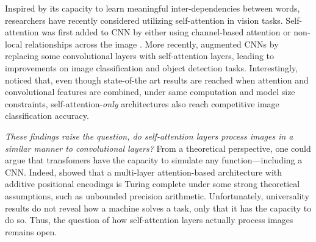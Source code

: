 \documentclass{article} \usepackage{iclr2020_conference,times}
\begin{document}
Inspired by its capacity to learn meaningful inter-dependencies between words, researchers have recently considered utilizing self-attention in vision tasks.
Self-attention was first added to CNN by either using channel-based attention \citep{DBLP:conf/cvpr/HuSS18} or non-local relationships across the image \citep{nonlocal2018wang}.
More recently, \citet{belloAttentionAugmentedConvolutional2019} augmented CNNs by replacing some convolutional layers with self-attention layers, leading to improvements on image classification and object detection tasks.
Interestingly, \cite{ramachandran2019standaloneselfattention} noticed that, even though state-of-the art results are reached when attention and convolutional features are combined, under same computation and model size constraints, self-attention-\emph{only} architectures also reach competitive image classification accuracy.


\textit{These findings raise the question, do self-attention layers process images in a similar manner to convolutional layers?}
From a theoretical perspective, one could argue that transfomers have the capacity to simulate any function---including a CNN. Indeed, \cite{perez2019turingcomplete} showed that a multi-layer attention-based architecture with additive positional encodings is Turing complete under some strong theoretical assumptions, such as unbounded precision arithmetic.
Unfortunately, universality results do not reveal how a machine solves a task, only that it has the capacity to do so. Thus, the question of how self-attention layers actually process images remains open.
\end{document}
